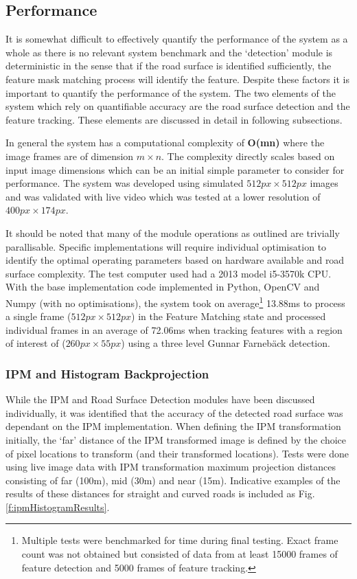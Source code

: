 \documentclass[]{aiaa-tc}%
\begin{document}
\subsection{Performance} \label{s:performance}

It is somewhat difficult to effectively quantify the performance of the system as a whole as there is no relevant system benchmark and the `detection' module is deterministic in the sense that if the road surface is identified sufficiently, the feature mask matching process will identify the feature. Despite these factors it is important to quantify the performance of the system. The two elements of the system which rely on quantifiable accuracy are the road surface detection and the feature tracking. These elements are discussed in detail in following subsections.

In general the system has a computational complexity of \textbf{O(mn)} where the image frames are of dimension $m\times n$. The complexity directly scales based on input image dimensions which can be an initial simple parameter to consider for performance. The system was developed using simulated $512px \times 512px$ images and was validated with live video which was tested at a lower resolution of $400px \times 174px$.

It should be noted that many of the module operations as outlined are trivially parallisable. Specific implementations will require individual optimisation to identify the optimal operating parameters based on hardware available and road surface complexity. The test computer used had a 2013 model i5-3570k CPU. With the base implementation code implemented in Python, OpenCV and Numpy (with no optimisations), the system took on average\footnote{Multiple tests were benchmarked for time during final testing. Exact frame count was not obtained but consisted of data from at least 15000 frames of feature detection and 5000 frames of feature tracking.} 13.88ms to process a single frame ($512px \times 512px$) in the Feature Matching state and processed individual frames in an average of 72.06ms when tracking features with a region of interest of ($260px \times 55px$) using a three level Gunnar Farneb{\"a}ck detection.

\subsubsection{IPM and Histogram Backprojection}

While the IPM and Road Surface Detection modules have been discussed individually, it was identified that the accuracy of the detected road surface was dependant on the IPM implementation. When defining the IPM transformation initially, the `far' distance of the IPM transformed image is defined by the choice of pixel locations to transform (and their transformed locations). Tests were done using live image data with IPM transformation maximum projection distances consisting of far (100m), mid (30m) and near (15m). Indicative examples of the results of these distances for straight and curved roads is included as Fig. \ref{f:ipmHistogramResults}.
\end{document}

